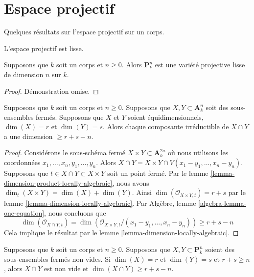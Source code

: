 \section{Espace projectif}
\label{section-projective-space}

\noindent
Quelques résultats sur l'espace projectif sur un corps.

\begin{lemma}
\label{lemma-projective-space-smooth}
\begin{slogan}
L'espace projectif est lisse.
\end{slogan}
Supposons que $k$ soit un corps et $n \geq 0$. Alors
$\mathbf{P}^n_k$ est une variété projective lisse de dimension $n$ sur $k$.
\end{lemma}

\begin{proof}
Démonstration omise.
\end{proof}

\begin{lemma}
\label{lemma-intersection-in-affine-space}
Supposons que $k$ soit un corps et $n \geq 0$. Supposons que $X, Y
\subset \mathbf{A}^n_k$ soit des sous-ensembles fermés. Supposons que $X$
et $Y$ soient équidimensionnels, $\dim(X) = r$ et $\dim(Y) = s$. Alors
chaque composante irréductible de $X \cap Y$ a une dimension $\geq r + s - n$.
\end{lemma}

\begin{proof}
Considérons le sous-schéma fermé $X \times Y \subset
\mathbf{A}^{2n}_k$ où nous utilisons les coordonnées
$x_1, \ldots, x_n, y_1, \ldots, y_n$. Alors $X \cap Y = X
\times Y \cap V(x_1 - y_1, \ldots, x_n - y_n)$. Supposons
que $t \in X \cap Y \subset X \times Y$ soit un point
fermé. Par le lemme
\ref{lemma-dimension-product-locally-algebraic}, nous avons $\dim_t(X
\times Y) = \dim(X) + \dim(Y)$. Ainsi $\dim(\mathcal{O}_{X \times Y,
t}) = r + s$ par le lemme \ref{lemma-dimension-locally-algebraic}.
Par Algèbre, lemme \ref{algebra-lemma-one-equation}, nous concluons que
$$
\dim(\mathcal{O}_{X \cap Y, t}) =
\dim(\mathcal{O}_{X \times Y, t}/(x_1 - y_1, \ldots, x_n - y_n)) \geq
r + s - n
$$
Cela implique le résultat par le lemme \ref{lemma-dimension-locally-algebraic}.
\end{proof}

\begin{lemma}
\label{lemma-intersection-in-projective-space}
Supposons que $k$ soit un corps et $n \geq 0$. Supposons que
$X, Y \subset \mathbf{P}^n_k$ soient des sous-ensembles fermés
non vides. Si $\dim(X) = r$ et $\dim(Y) = s$ et $r + s \geq n$,
alors $X \cap Y$ est non vide et $\dim(X \cap Y) \geq r + s - n$.
\end{lemma}

